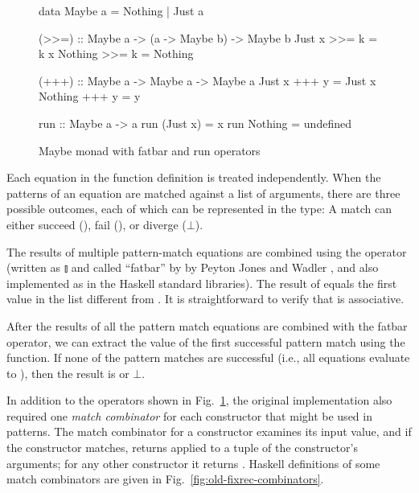 \begin{figure}
\begin{hscode}
data Maybe a = Nothing | Just a
\end{hscode}
\begin{hscode}
(>>=) :: Maybe a -> (a -> Maybe b) -> Maybe b
Just x >>= k = k x
Nothing >>= k = Nothing
\end{hscode}
\begin{hscode}
(+++) :: Maybe a -> Maybe a -> Maybe a
Just x +++ y = Just x
Nothing +++ y = y
\end{hscode}
\begin{hscode}
run :: Maybe a -> a
run (Just x) = x
run Nothing = undefined
\end{hscode}
\caption{Maybe monad with fatbar and run operators}
\label{fig:maybe-monad}
\end{figure}

Each equation in the function definition is treated independently. When the patterns of an equation are matched against a list of arguments, there are three possible outcomes, each of which can be represented in the  type: A match can either succeed (), fail (), or diverge ($\bot$).

The results of multiple pattern-match equations are combined using the \hs{(+++)} operator (written as $\talloblong$ and called ``fatbar'' by by Peyton Jones and Wadler \cite{PeytonJones87implementation}, and also implemented as  in the Haskell standard libraries). The result of  equals the first value in the list different from . It is straightforward to verify that \hs{(+++)} is associative.

After the results of all the pattern match equations are combined with the fatbar operator, we can extract the value of the first successful pattern match using the  function. If none of the pattern matches are successful (i.e., all equations evaluate to ), then the result is  or $\bot$.

In addition to the operators shown in Fig.~\ref{fig:maybe-monad}, the original {\fixrec} implementation also required one \emph{match combinator} for each constructor that might be used in patterns. The match combinator for a constructor examines its input value, and if the constructor matches, returns  applied to a tuple of the constructor's arguments; for any other constructor it returns . Haskell definitions of some match combinators are given in Fig.~\ref{fig:old-fixrec-combinators}.

